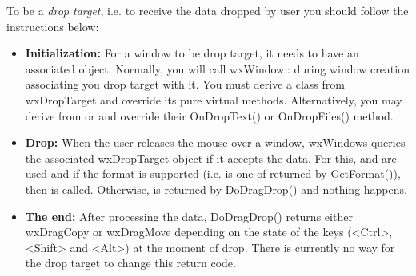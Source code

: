 To be a {\it drop target}, i.e. to receive the data dropped by user you should
follow the instructions below:

\begin{itemize}\itemsep=0pt
\item {\bf Initialization:} For a window to be drop target, it needs to have
an associated  object. Normally, you will
call wxWindow:: during window
creation associating you drop target with it. You must derive a class from
wxDropTarget and override its pure virtual methods. Alternatively, you may
derive from  or
 and override their OnDropText()
or OnDropFiles() method.

\item {\bf Drop:} When the user releases the mouse over a window, wxWindows
queries the associated wxDropTarget object if it accepts the data. For
this,  and
 are used and if the format is
supported (i.e. is one of returned by GetFormat()), 
then  is called. 
Otherwise,  is returned by DoDragDrop() and
nothing happens.

\item {\bf The end:} After processing the data, DoDragDrop() returns either
wxDragCopy or wxDragMove depending on the state of the keys (<Ctrl>, <Shift>
and <Alt>) at the moment of drop. There is currently no way for the drop
target to change this return code.

\end{itemize}

